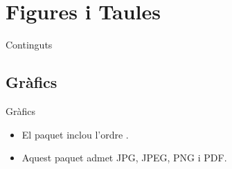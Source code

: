\section{Figures i Taules}
\begin{frame}{Continguts}
\tableofcontents[currentsection]
\end{frame}

\subsection{Gràfics}
\begin{frame}[fragile]{Gràfics}
\begin{itemize}
\item El paquet  inclou l'ordre .
\item Aquest paquet admet JPG, JPEG, PNG i PDF.
\end{itemize}

\end{frame}


